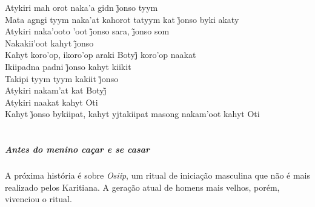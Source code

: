 \bigskip

\begin{linenumbers}\begingroup\raggedright
\noindent Atykiri mah orot naka’a gidn j̃onso tyym\\
Mata agngi tyym naka’at kahorot tatyym kat j̃onso byki akaty\\
Atykiri naka’ooto ’oot j̃onso sara, j̃onso som\\
Nakakii’oot kahyt j̃onso\\
Kahyt koro’op, ikoro’op araki Botyj̃ koro’op naakat\\
Ikiipadna padni j̃onso kahyt kiikit\\
Takipi tyym tyym kakiit j̃onso\\
Atykiri nakam’at kat Botyj̃\\
Atykiri naakat kahyt Oti\\
Kahyt j̃onso bykiipat, kahyt yjtakiipat masong nakam’oot kahyt Oti
\end{linenumbers}\endgroup

\chapter*{}
\thispagestyle{empty}

\vspace*{\fill}

\paragraph{Antes do menino caçar e se casar}
 A próxima história é sobre \textit{Osiip}, um ritual de iniciação masculina que
 não é mais realizado pelos Karitiana. A geração atual de homens mais
 velhos, porém, vivenciou o ritual. 

